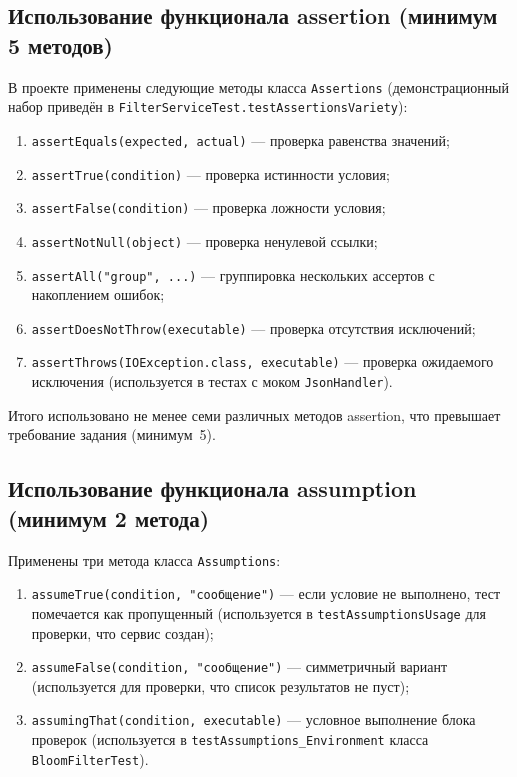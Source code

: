 \subsection{Использование функционала assertion (минимум 5 методов)}
В проекте применены следующие методы класса \texttt{Assertions} (демонстрационный набор приведён в \texttt{FilterServiceTest.testAssertionsVariety}):
\begin{enumerate}
    \item \texttt{assertEquals(expected, actual)} --- проверка равенства значений;
    \item \texttt{assertTrue(condition)} --- проверка истинности условия;
    \item \texttt{assertFalse(condition)} --- проверка ложности условия;
    \item \texttt{assertNotNull(object)} --- проверка ненулевой ссылки;
    \item \texttt{assertAll("group", ...)} --- группировка нескольких ассертов с накоплением ошибок;
    \item \texttt{assertDoesNotThrow(executable)} --- проверка отсутствия исключений;
    \item \texttt{assertThrows(IOException.class, executable)} --- проверка ожидаемого исключения (используется в тестах с моком \texttt{JsonHandler}).
\end{enumerate}
Итого использовано не менее семи различных методов assertion, что превышает требование задания (минимум~5).

\subsection{Использование функционала assumption (минимум 2 метода)}
Применены три метода класса \texttt{Assumptions}:
\begin{enumerate}
    \item \texttt{assumeTrue(condition, "сообщение")} --- если условие не выполнено, тест помечается как пропущенный (используется в \texttt{testAssumptionsUsage} для проверки, что сервис создан);
    \item \texttt{assumeFalse(condition, "сообщение")} --- симметричный вариант (используется для проверки, что список результатов не пуст);
    \item \texttt{assumingThat(condition, executable)} --- условное выполнение блока проверок (используется в \texttt{testAssumptions\_Environment} класса \texttt{BloomFilterTest}).
\end{enumerate}

